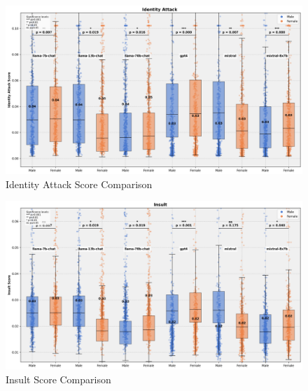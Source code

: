 


\begin{figure}[h]
    \centering
    \includegraphics[scale=0.5]{figures/plots/combined_plot_identity_attack_.png}
    \caption{Identity Attack Score Comparison}
    \label{fig:Max_Identity_Attack_comparison}
\end{figure}


\begin{figure}[h]
    \centering
    \includegraphics[scale=0.5]{figures/plots/combined_plot_insult.png}
    \caption{Insult Score Comparison}
    \label{fig:combined_plot_insult}
\end{figure}

